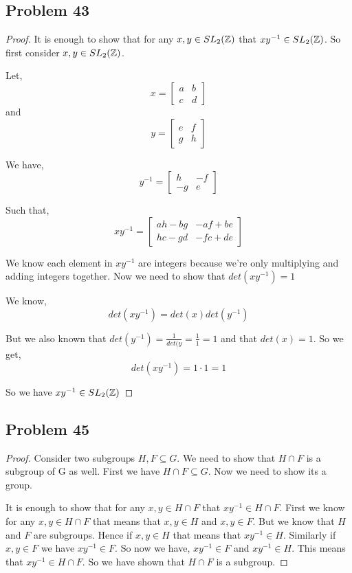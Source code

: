 \documentclass[a4paper]{report}
\begin{document}
\subsection*{Problem 43}

\begin{proof}
    It is enough to show that for any $x,y \in SL_2(\mathbb{Z})$ that $xy^{-1} \in SL_2(\mathbb{Z})$. So first consider $x,y \in SL_2(\mathbb{Z})$.

    Let, 
    $$ x = \begin{bmatrix}  a & b \\ c & d\end{bmatrix} $$ 
    and
    $$ y = \begin{bmatrix}  e & f \\ g & h\end{bmatrix} $$ 

    We have, 
    $$ y^{-1} = \begin{bmatrix}  h & -f \\ -g & e\end{bmatrix} $$ 

    Such that, 
    $$ xy^{-1} = \begin{bmatrix}  ah - bg & -af + be \\ hc - gd & -fc + de\end{bmatrix} $$ 

    We know each element in $xy^{-1}$ are integers because we're only multiplying and adding integers together. Now we need to show that $det(xy^{-1}) = 1$

    We know, 
    $$ det(xy^{-1}) = det(x) det(y^{-1}) $$

    But we also known that $det(y^{-1}) = \frac{1}{det(y} = \frac{1}{1} = 1$  and that $det(x) = 1$. So we get, 
    $$ det(xy^{-1}) = 1 \cdot 1 = 1 $$ 

    So we have $xy^{-1} \in SL_2(\mathbb{Z})$


\end{proof}
\subsection*{Problem 45}
\begin{proof}
    Consider two subgroups $H,F \subseteq G$. We need to show that  $H \cap F$ is a subgroup of G as well. First we have $H \cap F \subseteq G$. Now we need to show its a group.

    It is enough to show that for any $x,y \in H \cap F$ that $xy^{-1} \in H \cap F$. First we know for any $x , y \in H \cap F$ that means that $x,y \in H $ and $x,y \in F$. But we know that  $H$ and $F$ are subgroups. Hence if $x,y \in H$ that means that $xy^{-1} \in H$. Similarly if $x,y \in F$ we have $xy^{-1} \in F$. So now we have, $xy^{-1} \in F$ and $xy^{-1} \in H$. This means that $xy^{-1} \in H \cap F$. So we have shown that $H \cap F$ is a subgroup.
\end{proof}
\end{document}
